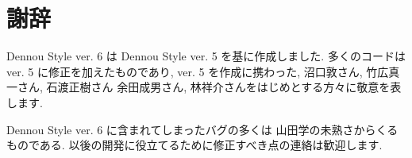 %
%

\section*{謝辞}
	Dennou Style ver. 6 は Dennou Style ver. 5 を基に作成しました.
	多くのコードは ver. 5 に修正を加えたものであり,
	ver. 5 を作成に携わった, 沼口敦さん, 竹広真一さん, 石渡正樹さん
	余田成男さん, 林祥介さんをはじめとする方々に敬意を表します.

	Dennou Style ver. 6 に含まれてしまったバグの多くは
	山田学の未熟さからくるものである.
	以後の開発に役立てるために修正すべき点の連絡は歓迎します.
